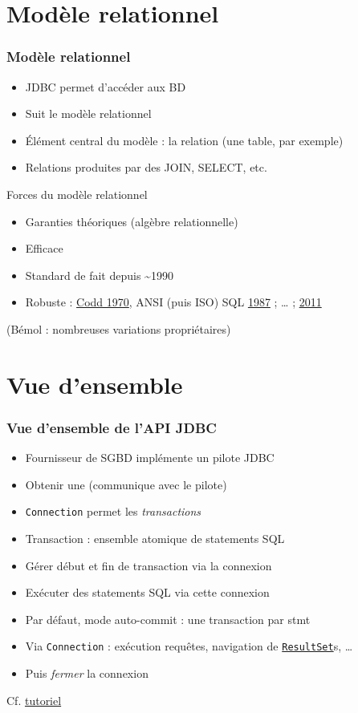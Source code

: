\documentclass[english, french]{beamer}
\begin{document}
\section{Modèle relationnel}
\begin{frame}
	\frametitle{Modèle relationnel}
	\begin{itemize}
		\item JDBC permet d’accéder aux BD
		\item Suit le modèle relationnel
		\item Élément central du modèle : la relation (une table, par exemple)
		\item Relations produites par des JOIN, SELECT, etc.
	\end{itemize}
	\begin{block}{Forces du modèle relationnel}
		\pause
		\begin{itemize}
			\item Garanties théoriques (algèbre relationnelle)
			\item Efficace
			\item Standard de fait depuis \textasciitilde 1990
			\item Robuste : \href{http://dl.acm.org/citation.cfm?id=362685}{Codd 1970}, ANSI (puis ISO) SQL \href{http://www.iso.org/iso/home/store/catalogue_ics/catalogue_detail_ics.htm?csnumber=16661}{1987} ; … ; \href{http://www.iso.org/iso/home/store/catalogue_ics/catalogue_detail_ics.htm?csnumber=53681}{2011}
		\end{itemize}
	\end{block}
	(Bémol : nombreuses variations propriétaires)
\end{frame}

\section{Vue d’ensemble}
\begin{frame}
	\frametitle{Vue d’ensemble de l’API JDBC}
	\begin{itemize}
		\item Fournisseur de SGBD implémente un pilote JDBC
		\item Obtenir une  (communique avec le pilote)
		\item \texttt{Connection} permet les \emph{transactions}
		\item Transaction : ensemble atomique de \og{}statements\fg{} SQL
		\item Gérer début et fin de transaction via la connexion
		\item Exécuter des statements SQL via cette connexion
		\item Par défaut, mode auto-commit : une transaction par stmt
		\item Via \texttt{Connection} : exécution requêtes, navigation de \href{http://docs.oracle.com/javase/8/docs/api/java/sql/ResultSet.html}{\texttt{ResultSet}}s, …
		\item Puis \emph{fermer} la connexion
	\end{itemize}
	Cf. \href{https://docs.oracle.com/javase/tutorial/jdbc/}{tutoriel}
\end{frame}
\end{document}
